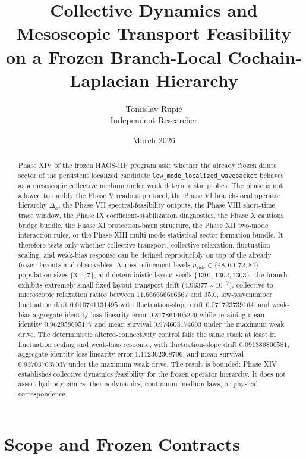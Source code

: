 \documentclass[11pt]{article}
\title{Collective Dynamics and Mesoscopic Transport Feasibility on a Frozen Branch-Local Cochain-Laplacian Hierarchy}
\author{Tomislav Rupi\'c \\ Independent Researcher}
\date{March 2026}
\begin{document}
\maketitle

\begin{abstract}
Phase XIV of the frozen HAOS-IIP program asks whether the already frozen dilute sector of the persistent localized candidate
\texttt{low\_mode\_localized\_wavepacket} behaves as a mesoscopic collective medium under weak deterministic probes. The phase is not allowed to modify the Phase V readout protocol, the Phase VI branch-local operator hierarchy $\Delta_h$, the Phase VII spectral-feasibility outputs, the Phase VIII short-time trace window, the Phase IX coefficient-stabilization diagnostics, the Phase X cautious bridge bundle, the Phase XI protection-basin structure, the Phase XII two-mode interaction rules, or the Phase XIII multi-mode statistical sector formation bundle. It therefore tests only whether collective transport, collective relaxation, fluctuation scaling, and weak-bias response can be defined reproducibly on top of the already frozen layouts and observables. Across refinement levels $n_{\mathrm{side}}\in\{48,60,72,84\}$, population sizes $\{3,5,7\}$, and deterministic layout seeds $\{1301,1302,1303\}$, the branch exhibits extremely small fixed-layout transport drift ($4.96377\times 10^{-7}$), collective-to-microscopic relaxation ratios between $11.666666666667$ and $35.0$, low-wavenumber fluctuation drift $0.010741131495$ with fluctuation-slope drift $0.071723739164$, and weak-bias aggregate identity-loss linearity error $0.817861405229$ while retaining mean identity $0.962058695177$ and mean survival $0.974603174603$ under the maximum weak drive. The deterministic altered-connectivity control fails the same stack at least in fluctuation scaling and weak-bias response, with fluctuation-slope drift $0.091386800581$, aggregate identity-loss linearity error $1.112362308706$, and mean survival $0.937037037037$ under the maximum weak drive. The result is bounded: Phase XIV establishes collective dynamics feasibility for the frozen operator hierarchy. It does not assert hydrodynamics, thermodynamics, continuum medium laws, or physical correspondence.
\end{abstract}

\section{Scope and Frozen Contracts}
\end{document}
